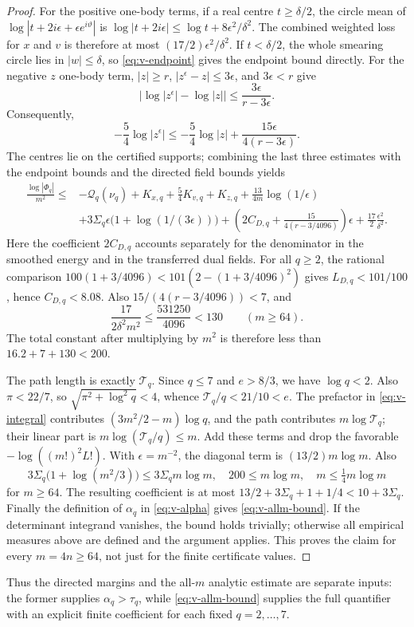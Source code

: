 \begin{proof}
For the positive one-body terms, if a real centre $t\ge\delta/2$, the
circle mean of $\log|t+2i\epsilon+\epsilon e^{i\vartheta}|$ is
$\log|t+2i\epsilon|\le\log t+8\epsilon^2/\delta^2$.  The combined
weighted loss for $x$ and $v$ is therefore at most
$(17/2)\epsilon^2/\delta^2$.  If $t<\delta/2$, the whole smearing circle
lies in $|w|\le\delta$, so \eqref{eq:v-endpoint} gives the endpoint bound directly.
For the negative $z$ one-body term, $|z|\ge r$,
$|z^\epsilon-z|\le3\epsilon$, and $3\epsilon<r$ give
\[
 \left|\log|z^\epsilon|-\log|z|\right|
 \le\frac{3\epsilon}{r-3\epsilon}.
\]
Consequently,
\[
 -\frac54\log|z^\epsilon|
 \le-\frac54\log|z|+\frac{15\epsilon}{4(r-3\epsilon)}.
\]
The centres lie on the certified supports; combining the last three
estimates with the endpoint bounds and the directed field bounds yields
\begin{align*}
 \frac{\log|\Phi_q|}{m^2}
 \le{}&-\mathcal Q_q(\nu_q)+K_{x,q}+\frac54K_{v,q}+K_{z,q}
 +\frac{13}{4m}\log(1/\epsilon)\\
 &+3\Sigma_q\epsilon\bigl(1+\log(1/(3\epsilon))\bigr)
 +\left(2C_{D,q}+\frac{15}{4(r-3/4096)}\right)\epsilon
 +\frac{17}{2}\frac{\epsilon^2}{\delta^2}.
\end{align*}
Here the coefficient $2C_{D,q}$ accounts separately for the denominator
in the smoothed energy and in the transferred dual fields.  For all
$q\ge2$, the rational comparison
$100(1+3/4096)<101(2-(1+3/4096)^2)$ gives
$L_{D,q}<101/100$, hence $C_{D,q}<8.08$.  Also
$15/(4(r-3/4096))<7$, and
\[
 \frac{17}{2\delta^2m^2}\le\frac{531250}{4096}<130
 \qquad(m\ge64).
\]
The total constant after multiplying by $m^2$ is therefore less than
$16.2+7+130<200$.

The path length is exactly $\mathcal T_q$.  Since $q\le7$ and $e>8/3$, we have
$\log q<2$.  Also $\pi<22/7$, so
$\sqrt{\pi^2+\log^2q}<4$, whence
$\mathcal T_q/q<21/10<e$.  The prefactor in \eqref{eq:v-integral} contributes
$(3m^2/2-m)\log q$, and the path contributes $m\log\mathcal T_q$; their linear
part is $m\log(\mathcal T_q/q)\le m$.  Add these terms and drop the favorable
$-\log((m!)^2L!)$.  With $\epsilon=m^{-2}$, the diagonal term is
$(13/2)m\log m$.  Also
\[
 3\Sigma_q\bigl(1+\log(m^2/3)\bigr)\le3\Sigma_qm\log m,
 \quad 200\le m\log m,
 \quad m\le\tfrac14m\log m
\]
for $m\ge64$.  The resulting coefficient is at most
$13/2+3\Sigma_q+1+1/4<10+3\Sigma_q$.  Finally the definition of $\alpha_q$ in
\eqref{eq:v-alpha} gives \eqref{eq:v-allm-bound}.  If the determinant
integrand vanishes, the bound holds trivially; otherwise all empirical
measures above are defined and the argument applies.  This proves the
claim for every $m=4n\ge64$, not just for the finite certificate values.
\end{proof}

Thus the directed margins and the all-$m$ analytic estimate are separate
inputs: the former supplies $\alpha_q>\tau_q$, while
\eqref{eq:v-allm-bound} supplies the full quantifier with an explicit
finite coefficient for each fixed $q=2,\ldots,7$.
